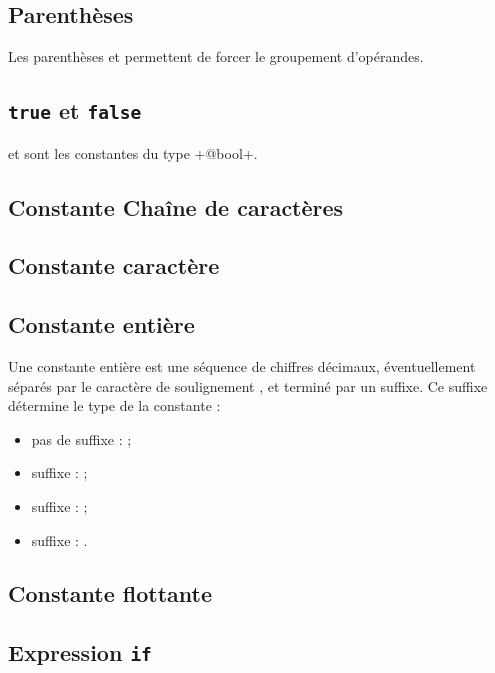 \subsection{Parenthèses}

Les parenthèses \galgas{(} et \galgas{)} permettent de forcer le groupement d'opérandes.






\subsection{\texttt{true} et \texttt{false}}

 et  sont les constantes du type \ggs+@bool+.

\subsection{Constante Chaîne de caractères}

\subsection{Constante caractère}

\subsection{Constante entière}

Une constante entière est une séquence de chiffres décimaux, éventuellement séparés par le caractère de soulignement \galgas{_}, et terminé par un suffixe. Ce suffixe détermine le type de la constante :
\begin{itemize}
  \item pas de suffixe :  ;
  \item suffixe  :  ;
  \item suffixe  :  ;
  \item suffixe  : .
\end{itemize}

\subsection{Constante flottante}

\subsection{Expression \texttt{if}}


